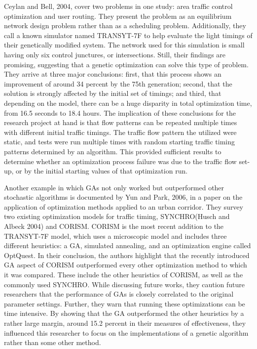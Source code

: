 Ceylan and Bell, 2004\cite{biGA}, cover two problems in one study: area traffic control optimization and user routing.  They present the problem as an equilibrium network design problem rather than as a scheduling problem.  Additionally, they call a known simulator named TRANSYT-7F to help evaluate the light timings of their genetically modified system.  The network used for this simulation is small having only six control junctures, or intersections.  Still, their findings are promising, suggesting that a genetic optimization can solve this type of problem.  They arrive at three major conclusions: first, that this process shows an improvement of around 34 percent by the 75th generation; second, that the solution is strongly affected by the initial set of timings; and third, that depending on the model, there can be a huge disparity in total optimization time, from 16.5 seconds to 18.4 hours\cite{biGA}.  The implication of these conclusions for the research project at hand is that flow patterns can be repeated multiple times with different initial traffic timings.  The traffic flow pattern the utilized were static, and tests were run multiple times with random starting traffic timing patterns determined by an algorithm.  This provided sufficient results to determine whether an optimization process failure was due to the traffic flow set-up, or by the initial starting values of that optimization run. 

Another example in which GAs not only worked but outperformed other stochastic algorithms is documented by Yun and Park, 2006\cite{CORISM}, in a paper on the application of optimization methods applied to an urban corridor.  They survey two existing optimization models for traffic timing, SYNCHRO(Husch and Albeck 2004) and CORISM.  CORISM is the most recent addition to the TRANSYT-7F model, which uses a microscopic model and includes three different heuristics: a GA, simulated annealing, and an optimization engine called OptQuest.   In their conclusion, the authors highlight that the recently introduced GA aspect of CORISM outperformed every other optimization method to which it was compared.  These include the other heuristics of CORISM, as well as the commonly used SYNCHRO.  While discussing future works, they caution future researchers that the performance of GAs is closely correlated to the original parameter settings.  Further, they warn that running these optimizations can be time intensive.  By showing that the GA outperformed the other heuristics by a rather large margin, around 15.2 percent in their measures of effectiveness, they influenced this researcher to focus on the implementations of a genetic algorithm rather than some other method\cite{CORISM}.


